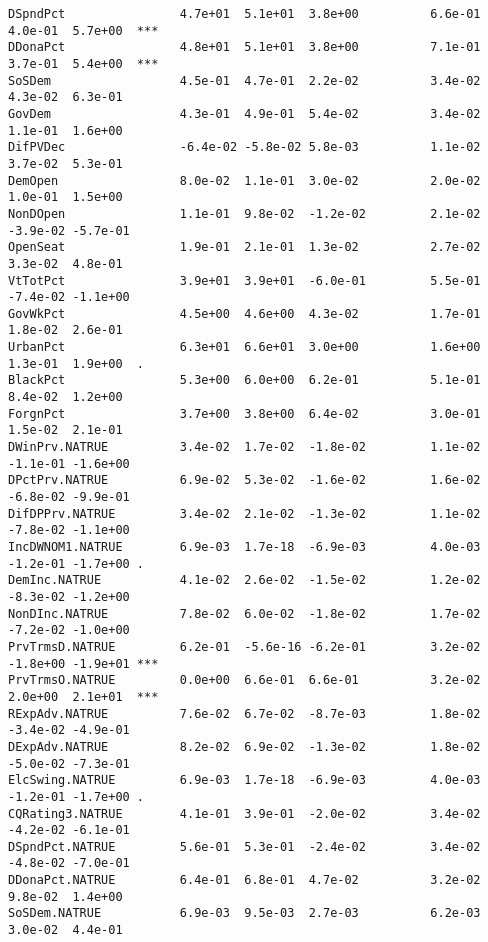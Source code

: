 \documentclass[11pt,leqno]{article}\usepackage[]{graphicx}\usepackage[]{color}
\makeatletter
\newenvironment{kframe}{%
 \def\at@end@of@kframe{}%
 \ifinner\ifhmode%
  \def\at@end@of@kframe{\end{minipage}}%
  \begin{minipage}{\columnwidth}%
 \fi\fi%
 \def\FrameCommand##1{\hskip\@totalleftmargin \hskip-\fboxsep
 \colorbox{shadecolor}{##1}\hskip-\fboxsep
     \hskip-\linewidth \hskip-\@totalleftmargin \hskip\columnwidth}%
 \MakeFramed {\advance\hsize-\width
   \@totalleftmargin\z@ \linewidth\hsize
   \@setminipage}}%
 {\par\unskip\endMakeFramed%
 \at@end@of@kframe}
\newenvironment{knitrout}{}{} %
\theoremstyle{newstyle}
\makeatother
\begin{document}
\begin{knitrout}
\begin{kframe}
\begin{verbatim}
DSpndPct                4.7e+01  5.1e+01  3.8e+00          6.6e-01  4.0e-01  5.7e+00  ***     
DDonaPct                4.8e+01  5.1e+01  3.8e+00          7.1e-01  3.7e-01  5.4e+00  ***     
SoSDem                  4.5e-01  4.7e-01  2.2e-02          3.4e-02  4.3e-02  6.3e-01          
GovDem                  4.3e-01  4.9e-01  5.4e-02          3.4e-02  1.1e-01  1.6e+00          
DifPVDec                -6.4e-02 -5.8e-02 5.8e-03          1.1e-02  3.7e-02  5.3e-01          
DemOpen                 8.0e-02  1.1e-01  3.0e-02          2.0e-02  1.0e-01  1.5e+00          
NonDOpen                1.1e-01  9.8e-02  -1.2e-02         2.1e-02  -3.9e-02 -5.7e-01         
OpenSeat                1.9e-01  2.1e-01  1.3e-02          2.7e-02  3.3e-02  4.8e-01          
VtTotPct                3.9e+01  3.9e+01  -6.0e-01         5.5e-01  -7.4e-02 -1.1e+00         
GovWkPct                4.5e+00  4.6e+00  4.3e-02          1.7e-01  1.8e-02  2.6e-01          
UrbanPct                6.3e+01  6.6e+01  3.0e+00          1.6e+00  1.3e-01  1.9e+00  .       
BlackPct                5.3e+00  6.0e+00  6.2e-01          5.1e-01  8.4e-02  1.2e+00          
ForgnPct                3.7e+00  3.8e+00  6.4e-02          3.0e-01  1.5e-02  2.1e-01          
DWinPrv.NATRUE          3.4e-02  1.7e-02  -1.8e-02         1.1e-02  -1.1e-01 -1.6e+00         
DPctPrv.NATRUE          6.9e-02  5.3e-02  -1.6e-02         1.6e-02  -6.8e-02 -9.9e-01         
DifDPPrv.NATRUE         3.4e-02  2.1e-02  -1.3e-02         1.1e-02  -7.8e-02 -1.1e+00         
IncDWNOM1.NATRUE        6.9e-03  1.7e-18  -6.9e-03         4.0e-03  -1.2e-01 -1.7e+00 .       
DemInc.NATRUE           4.1e-02  2.6e-02  -1.5e-02         1.2e-02  -8.3e-02 -1.2e+00         
NonDInc.NATRUE          7.8e-02  6.0e-02  -1.8e-02         1.7e-02  -7.2e-02 -1.0e+00         
PrvTrmsD.NATRUE         6.2e-01  -5.6e-16 -6.2e-01         3.2e-02  -1.8e+00 -1.9e+01 ***     
PrvTrmsO.NATRUE         0.0e+00  6.6e-01  6.6e-01          3.2e-02  2.0e+00  2.1e+01  ***     
RExpAdv.NATRUE          7.6e-02  6.7e-02  -8.7e-03         1.8e-02  -3.4e-02 -4.9e-01         
DExpAdv.NATRUE          8.2e-02  6.9e-02  -1.3e-02         1.8e-02  -5.0e-02 -7.3e-01         
ElcSwing.NATRUE         6.9e-03  1.7e-18  -6.9e-03         4.0e-03  -1.2e-01 -1.7e+00 .       
CQRating3.NATRUE        4.1e-01  3.9e-01  -2.0e-02         3.4e-02  -4.2e-02 -6.1e-01         
DSpndPct.NATRUE         5.6e-01  5.3e-01  -2.4e-02         3.4e-02  -4.8e-02 -7.0e-01         
DDonaPct.NATRUE         6.4e-01  6.8e-01  4.7e-02          3.2e-02  9.8e-02  1.4e+00          
SoSDem.NATRUE           6.9e-03  9.5e-03  2.7e-03          6.2e-03  3.0e-02  4.4e-01          

\end{verbatim}
\end{kframe}
\end{knitrout}
\end{document}

